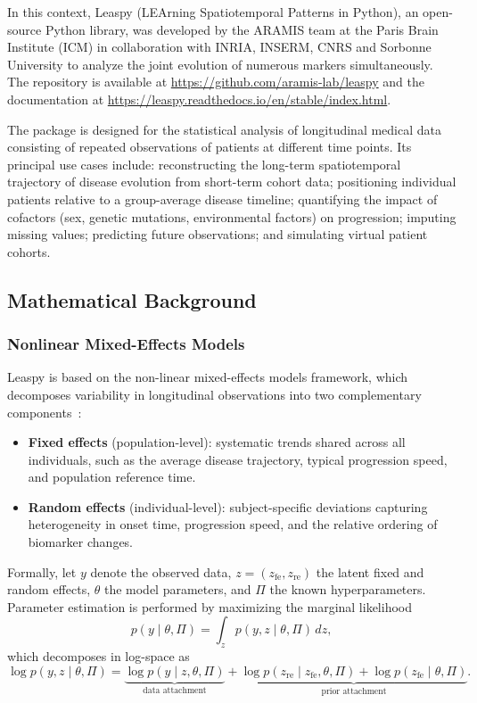 \documentclass{rapportCS}
\begin{document}
In this context, Leaspy (LEArning Spatiotemporal Patterns in Python), an open-source Python library, was developed by the ARAMIS team at the Paris Brain Institute (ICM) in collaboration with INRIA, INSERM, CNRS and Sorbonne University to analyze the joint evolution of numerous markers simultaneously. The repository is available at \url{https://github.com/aramis-lab/leaspy} and the documentation at \url{https://leaspy.readthedocs.io/en/stable/index.html}. 

The package is designed for the statistical analysis of longitudinal medical data consisting of repeated observations of patients at different time points. Its principal use cases include: reconstructing the long-term spatiotemporal trajectory of disease evolution from short-term cohort data; positioning individual patients relative to a group-average disease timeline; quantifying the impact of cofactors (sex, genetic mutations, environmental factors) on progression; imputing missing values; predicting future observations; and simulating virtual patient cohorts.

\subsection{Mathematical Background}

\subsubsection{Nonlinear Mixed-Effects Models}

Leaspy is based on the non-linear mixed-effects models framework, which decomposes variability in longitudinal observations into two complementary components~\cite{schiratti2017bayesian}:

\begin{itemize}
  \item \textbf{Fixed effects} (population-level): systematic trends shared across all individuals, such as the average disease trajectory, typical progression speed, and population reference time.
  \item \textbf{Random effects} (individual-level): subject-specific deviations capturing heterogeneity in onset time, progression speed, and the relative ordering of biomarker changes.
\end{itemize}

Formally, let $y$ denote the observed data, $z = (z_{\mathrm{fe}}, z_{\mathrm{re}})$ the latent fixed and random effects, $\theta$ the model parameters, and $\Pi$ the known hyperparameters. Parameter estimation is performed by maximizing the marginal likelihood
\begin{equation}
  p(y \mid \theta, \Pi) = \int_{z} p(y, z \mid \theta, \Pi)\, dz,
\end{equation}
which decomposes in log-space as
\begin{equation}
  \log p(y, z \mid \theta, \Pi)
    = \underbrace{\log p(y \mid z, \theta, \Pi)}_{\text{data attachment}}
    + \underbrace{\log p(z_{\mathrm{re}} \mid z_{\mathrm{fe}}, \theta, \Pi)
                + \log p(z_{\mathrm{fe}} \mid \theta, \Pi)}_{\text{prior attachment}}.
\end{equation}
\end{document}
